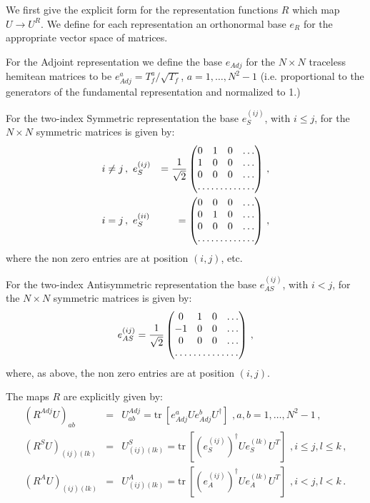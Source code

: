 \documentclass{article}[12pt]
\begin{document}
We first give the explicit form for the representation functions $R$ which map
$U\rightarrow U^R$. We define for each representation an orthonormal base $e_R$ for
the appropriate vector space of matrices.

For the Adjoint representation we define the base $e_{Adj}$ for the $N\times N$
traceless hemitean matrices to be $e_{Adj}^a=T^a_f/\sqrt{T_f}$, $a=1,\dots,N^2-1$
(i.e. proportional to the generators of the fundamental representation and
normalized to 1.)

For the two-index Symmetric representation the base $e^{(ij)}_{S}$, with $i\le j$, for
the $N\times N$ symmetric matrices is given by:
\begin{eqnarray}
i\neq j \, ,\,\,\,&e^{(ij)}_S&=\frac{1}{\sqrt{2}}\begin{pmatrix}
0&1&0&\dots\\
1&0&0&\dots\\
0&0&0&\dots\\
\hdotsfor{4}
\end{pmatrix}\, , \\
i=j \, ,\,\,\,&e^{(ii)}_S&=\begin{pmatrix}
0&0&0&\dots\\
0&1&0&\dots\\
0&0&0&\dots\\
\hdotsfor{4}
\end{pmatrix}\, ,
\end{eqnarray}
where the non zero entries are at position $(i,j)$, etc.

For the two-index Antisymmetric representation the base $e^{(ij)}_{AS}$, with $i<j$, for
the $N\times N$ symmetric matrices is given by:
\begin{equation}
e^{(ij)}_{AS}=\frac{1}{\sqrt{2}}\begin{pmatrix}
0&1&0&\dots\\
-1&0&0&\dots\\
0&0&0&\dots\\
\hdotsfor{4}
\end{pmatrix}\, ,
\end{equation}
where, as above, the non zero entries are at position $(i,j)$.

The maps $R$ are explicitly given by:
\begin{eqnarray}
(R^{Adj} U)_{ab} &=& U^{Adj}_{ab} = \mathrm{tr\ }\left[ e^a_{Adj} U e^b_{Adj} U^\dagger\right]\,\, , a,b=1,\dots,N^2-1\, ,\\
(R^{S} U)_{(ij)(lk)} &=& U^{S}_{(ij)(lk)} = \mathrm{tr\ }\left[ (e^{(ij)}_{S})^\dagger U e^{(lk)}_S U^T\right]\,\, , i\le j, l\le k\, ,\\
(R^{A} U)_{(ij)(lk)} &=& U^{A}_{(ij)(lk)} = \mathrm{tr\ }\left[ (e^{(ij)}_{A})^\dagger U e^{(lk)}_A U^T\right]\,\, , i< j, l< k\, .
\end{eqnarray}
\end{document}
